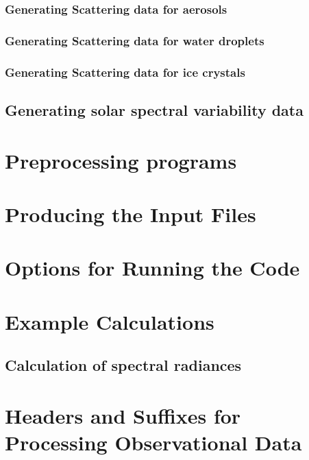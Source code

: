 \documentclass[11pt,a4paper,english,twoside,openany]{book}
\begin{document}
\subsection{Generating Scattering data for aerosols}

\subsection{Generating Scattering data for water droplets}

\subsection{Generating Scattering data for ice crystals}

\section{Generating solar spectral variability data}


\chapter{Preprocessing programs}


\chapter{Producing the Input Files}


\chapter{Options for Running the Code}


\chapter{Example Calculations}

\section{Calculation of spectral radiances}




\appendix

\chapter{Headers and Suffixes for Processing Observational Data}

\end{document}
